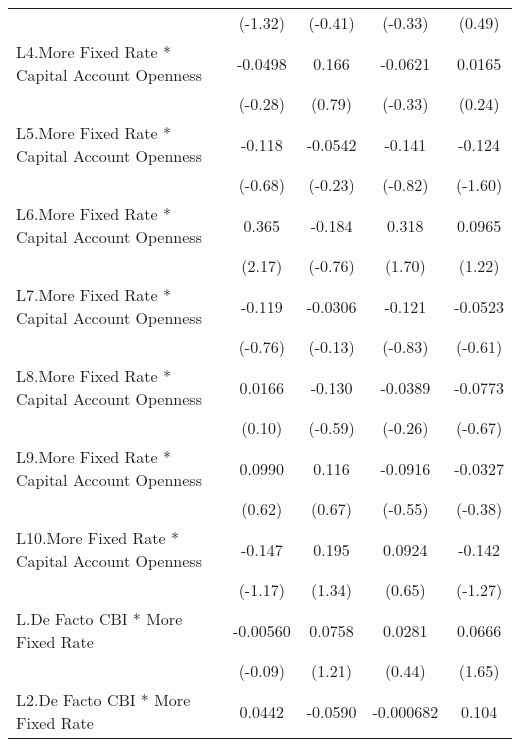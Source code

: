 {\begin{longtable}{l*{4}{c}}
                &  (-1.32)         &  (-0.41)         &  (-0.33)         &   (0.49)         \\
[1em]
L4.More Fixed Rate * Capital Account Openness&  -0.0498         &    0.166         &  -0.0621         &   0.0165         \\
                &  (-0.28)         &   (0.79)         &  (-0.33)         &   (0.24)         \\
[1em]
L5.More Fixed Rate * Capital Account Openness&   -0.118         &  -0.0542         &   -0.141         &   -0.124         \\
                &  (-0.68)         &  (-0.23)         &  (-0.82)         &  (-1.60)         \\
[1em]
L6.More Fixed Rate * Capital Account Openness&    0.365\sym{*}  &   -0.184         &    0.318         &   0.0965         \\
                &   (2.17)         &  (-0.76)         &   (1.70)         &   (1.22)         \\
[1em]
L7.More Fixed Rate * Capital Account Openness&   -0.119         &  -0.0306         &   -0.121         &  -0.0523         \\
                &  (-0.76)         &  (-0.13)         &  (-0.83)         &  (-0.61)         \\
[1em]
L8.More Fixed Rate * Capital Account Openness&   0.0166         &   -0.130         &  -0.0389         &  -0.0773         \\
                &   (0.10)         &  (-0.59)         &  (-0.26)         &  (-0.67)         \\
[1em]
L9.More Fixed Rate * Capital Account Openness&   0.0990         &    0.116         &  -0.0916         &  -0.0327         \\
                &   (0.62)         &   (0.67)         &  (-0.55)         &  (-0.38)         \\
[1em]
L10.More Fixed Rate * Capital Account Openness&   -0.147         &    0.195         &   0.0924         &   -0.142         \\
                &  (-1.17)         &   (1.34)         &   (0.65)         &  (-1.27)         \\
[1em]
L.De Facto CBI * More Fixed Rate& -0.00560         &   0.0758         &   0.0281         &   0.0666         \\
                &  (-0.09)         &   (1.21)         &   (0.44)         &   (1.65)         \\
[1em]
L2.De Facto CBI * More Fixed Rate&   0.0442         &  -0.0590         &-0.000682         &    0.104\sym{*}  \\

\end{longtable}}
